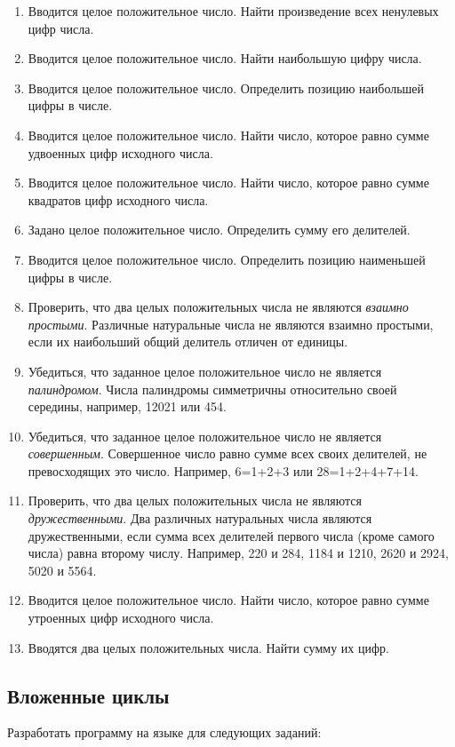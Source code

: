 \begin{enumerate}
\item Вводится целое положительное число. Найти произведение всех ненулевых цифр числа.
\item Вводится целое положительное число. Найти наибольшую цифру числа.
\item Вводится целое положительное число. Определить позицию наибольшей цифры в числе.
\item Вводится целое положительное число. Найти число, которое равно сумме удвоенных цифр исходного числа.
\item Вводится целое положительное число. Найти число, которое равно сумме квадратов цифр исходного числа.
\item Задано целое положительное число. Определить сумму его делителей.
\item Вводится целое положительное число. Определить позицию наименьшей цифры в числе.
\item Проверить, что два целых положительных числа не являются \emph{взаимно простыми}. Различные
натуральные числа не являются взаимно простыми, если их наибольший общий делитель отличен от единицы.
\item Убедиться, что заданное целое положительное число не является \emph{палиндромом}. Числа палиндромы
симметричны относительно своей середины, например, 12021 или 454.
\item Убедиться, что заданное целое положительное число не является \emph{совершенным}. Совершенное число
равно сумме всех своих делителей, не превосходящих это число. Например, 6=1+2+3 или 28=1+2+4+7+14.
\item Проверить, что два целых положительных числа не являются \emph{дружественными}. Два различных
натуральных числа являются дружественными, если сумма всех делителей первого числа (кроме самого числа) равна второму
числу. Например, 220 и 284, 1184 и 1210, 2620 и 2924, 5020 и 5564.
\item Вводится целое положительное число. Найти число, которое равно сумме утроенных цифр исходного числа.
\item Вводятся два целых положительных числа. Найти сумму их цифр. 
\end{enumerate}

\subsection[Вложенные циклы]{Вложенные циклы}
Разработать программу на языке  для следующих заданий:

